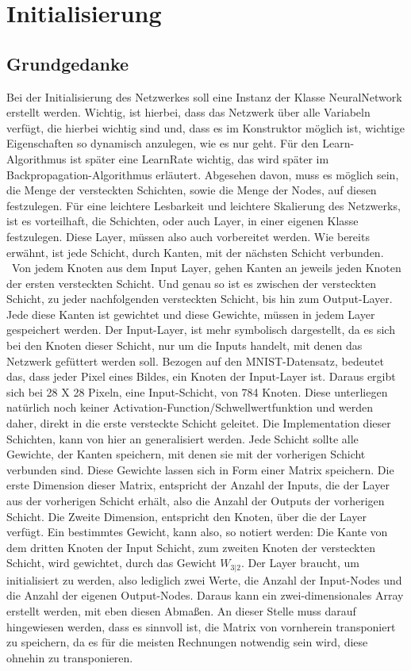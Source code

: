 \documentclass[12pt]{article}
\begin{document}
\section{Initialisierung}
\subsection{Grundgedanke}Bei der Initialisierung des Netzwerkes soll eine Instanz der Klasse NeuralNetwork erstellt werden. Wichtig, ist hierbei, dass das Netzwerk über alle Variabeln verfügt, die hierbei wichtig sind und, dass es im Konstruktor möglich ist, wichtige Eigenschaften so dynamisch anzulegen, wie es nur geht. Für den Learn-Algorithmus ist später eine LearnRate wichtig, das wird später im Backpropagation-Algorithmus erläutert. Abgesehen davon, muss es möglich sein, die Menge der versteckten Schichten, sowie die Menge der Nodes, auf diesen festzulegen. Für eine leichtere Lesbarkeit und leichtere Skalierung des Netzwerks, ist es vorteilhaft, die Schichten, oder auch Layer, in einer eigenen Klasse festzulegen. Diese Layer, müssen also auch vorbereitet werden. Wie bereits erwähnt, ist jede Schicht, durch Kanten, mit der nächsten Schicht verbunden.  Von jedem Knoten aus dem Input Layer, gehen Kanten an jeweils jeden Knoten der ersten versteckten Schicht. Und genau so ist es zwischen der versteckten Schicht, zu jeder nachfolgenden versteckten Schicht, bis hin zum Output-Layer. Jede diese Kanten ist gewichtet und diese Gewichte, müssen in jedem Layer gespeichert werden. Der Input-Layer, ist mehr symbolisch dargestellt, da es sich bei den Knoten dieser Schicht, nur um die Inputs handelt, mit denen das Netzwerk gefüttert werden soll. Bezogen auf den MNIST-Datensatz, bedeutet das, dass jeder Pixel eines Bildes, ein Knoten der Input-Layer ist. Daraus ergibt sich bei 28 X 28 Pixeln, eine Input-Schicht, von 784 Knoten. Diese unterliegen natürlich noch keiner Activation-Function/Schwellwertfunktion und werden daher, direkt in die erste versteckte Schicht geleitet. Die Implementation dieser Schichten, kann von hier an generalisiert werden. Jede Schicht sollte alle Gewichte, der Kanten speichern, mit denen sie mit der vorherigen Schicht verbunden sind. Diese Gewichte lassen sich in Form einer Matrix speichern. Die erste Dimension dieser Matrix, entspricht der Anzahl der Inputs, die der Layer aus der vorherigen Schicht erhält, also die Anzahl der Outputs der vorherigen Schicht. Die Zweite Dimension, entspricht den Knoten, über die der Layer verfügt. Ein bestimmtes Gewicht, kann also, so notiert werden: Die Kante von dem dritten Knoten der Input Schicht, zum zweiten Knoten der versteckten Schicht, wird gewichtet, durch das Gewicht $W_{3|2}$. Der Layer braucht, um initialisiert zu werden, also lediglich zwei Werte, die Anzahl der Input-Nodes und die Anzahl der eigenen Output-Nodes. Daraus kann ein zwei-dimensionales Array erstellt werden, mit eben diesen Abmaßen. An dieser Stelle muss darauf hingewiesen werden, dass es sinnvoll ist, die Matrix von vornherein transponiert zu speichern, da es für die meisten Rechnungen notwendig sein wird, diese ohnehin zu transponieren.
\end{document}
